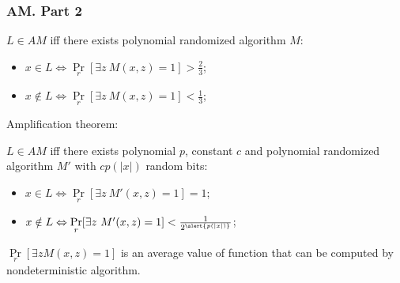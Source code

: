 \begin{frame}
    \frametitle{AM. Part 2}
    
    \begin{definition}
    	$L \in AM$ iff there exists polynomial randomized algorithm
        $M$:
        \begin{itemize}
			\item $x \in L \Leftrightarrow
        		\Pr\limits_{r}[\exists z~ M(x, z) = 1] 
        		> \frac{2}{3}$;
            \item $x \notin L \Leftrightarrow
        		\Pr\limits_{r}[\exists z~ M(x, z) = 1] 
        		< \frac{1}{3}$;
        \end{itemize}
    \end{definition}

    \pause
    Amplification theorem:
    \begin{theorem}
        $L \in AM$ iff there exists polynomial \alert{$p$}, constant $c$ and
        polynomial randomized algorithm $M'$ with \alert{$c p(|x|)$} random
        bits:
        \begin{itemize}
			\item $x \in L \Leftrightarrow
        		\Pr\limits_{r}[\exists z~ M'(x, z) = 1] = 1$;
            \item $x \notin L \Leftrightarrow
        		\Pr\limits_{r}[\exists z~ M'(x, z) = 1] 
        		< \frac{1}{2^{\alert{p(|x|)}}}$;
        \end{itemize}
    \end{theorem}

    \pause
    $\Pr\limits_{r}[\exists z M(x, z) = 1]$ is an average value of function that can
    be computed by nondeterministic algorithm.
\end{frame}

